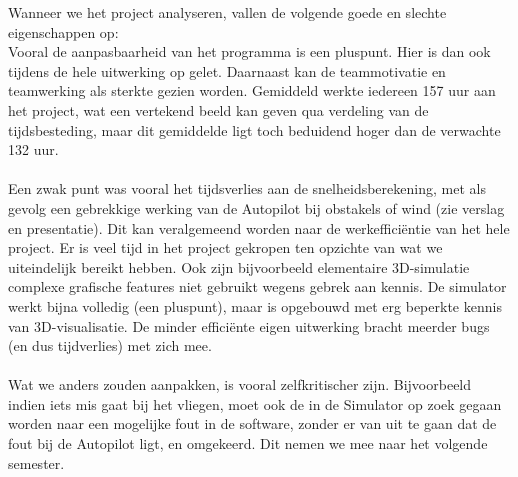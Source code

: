 \documentclass[]{penoverslag}
\begin{document}
Wanneer we het project analyseren, vallen de volgende goede en slechte eigenschappen op: \\
Vooral de aanpasbaarheid van het programma is een pluspunt. Hier is dan ook tijdens de hele uitwerking op gelet. Daarnaast kan de teammotivatie en teamwerking als sterkte gezien worden. Gemiddeld werkte iedereen 157 uur aan het project, wat een vertekend beeld kan geven qua verdeling van de tijdsbesteding, maar dit gemiddelde ligt toch beduidend hoger dan de verwachte 132 uur.
\\
\\
Een zwak punt was vooral het tijdsverlies aan de snelheidsberekening, met als gevolg een gebrekkige werking van de Autopilot bij obstakels of wind (zie verslag en presentatie). Dit kan veralgemeend worden naar de werkeffici\"entie van het hele project. Er is veel tijd in het project gekropen ten opzichte van wat we uiteindelijk bereikt hebben. Ook zijn bijvoorbeeld elementaire 3D-simulatie complexe grafische features niet gebruikt wegens gebrek aan kennis. De simulator werkt bijna volledig (een pluspunt), maar is opgebouwd met erg beperkte kennis van 3D-visualisatie. De minder effici\"ente eigen uitwerking bracht meerder bugs (en dus tijdverlies) met zich mee.
\\
\\
Wat we anders zouden aanpakken, is vooral zelfkritischer zijn. Bijvoorbeeld indien iets mis gaat bij het vliegen, moet ook de in de Simulator op zoek gegaan worden naar een mogelijke fout in de software, zonder er van uit te gaan dat de fout bij de Autopilot ligt, en omgekeerd. Dit nemen we mee naar het volgende semester.
\end{document}
